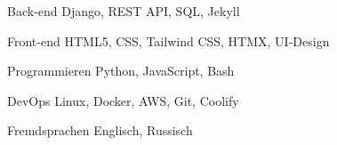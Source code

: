 
\begin{cvskills}

  \cvskill
  {Back-end} %
  {Django, REST API, SQL, Jekyll} %

  \cvskill
  {Front-end} %
  {HTML5, CSS, Tailwind CSS, HTMX, UI-Design} %

  \cvskill
  {Programmieren} %
  {Python, JavaScript, Bash} %

  \cvskill
  {DevOps} %
  {Linux, Docker, AWS, Git, Coolify} %

  \cvskill
  {Fremdsprachen} %
  {Englisch, Russisch} %

\end{cvskills}

